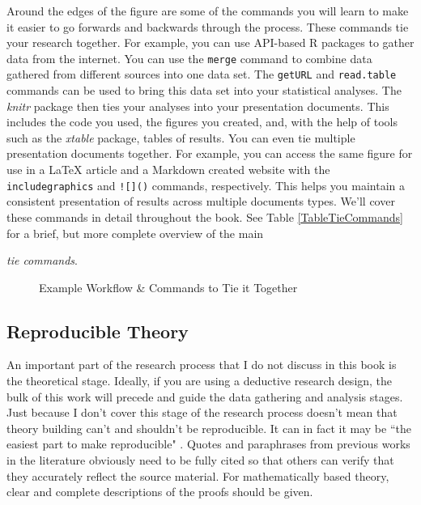 Around the edges of the figure are some of the commands you will learn to make it easier to go forwards and backwards through the process. These commands tie your research together. For example, you can use API-based R packages to gather data from the internet. You can use the \texttt{merge} command to combine data gathered from different sources into one data set. The \texttt{getURL} and {\texttt{read.table}} commands can be used to bring this data set into your statistical analyses. The {\emph{knitr}} package then ties your analyses into your presentation documents. This includes the code you used, the figures you created, and, with the help of tools such as the {\emph{xtable}} package, tables of results. You can even tie multiple presentation documents together. For example, you can access the same figure for use in a LaTeX article and a Markdown created website with the \texttt{includegraphics} and \texttt{![]()}\index{![]()} commands, respectively. This helps you maintain a consistent presentation of results across multiple documents types. We'll cover these commands in detail throughout the book. See Table \ref{TableTieCommands} for a brief, but more complete overview of the main {\emph{tie commands}. 


\clearpage
\thispagestyle{plain}
\begin{landscape}
    \begin{center}
\begin{figure}[th!]
    \caption{Example Workflow \& Commands to Tie it Together}
    \label{WorkflowTies}

    
    
\end{figure}
    \end{center}
\end{landscape}

\subsection{Reproducible Theory}

An important part of the research process that I do not discuss in this book is the theoretical stage. Ideally, if you are using a deductive research design, the bulk of this work will precede and guide the data gathering and analysis stages. Just because I don't cover this stage of the research process doesn't mean that theory building can't and shouldn't be reproducible. It can in fact it may be ``the easiest part to make reproducible" \cite[1254]{Vandewalle2007}. Quotes and paraphrases from previous works in the literature obviously need to be fully cited so that others can verify that they accurately reflect the source material. For mathematically based theory, clear and complete descriptions of the proofs should be given. 

}
